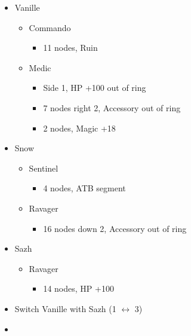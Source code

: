 \begin{paracol}{2}
\begin{menu}
\begin{itemize}
    \crystarium
    \begin{itemize}
        \item Vanille
        \begin{itemize}
            \item Commando
            \begin{itemize}
                \item 11 nodes, Ruin
            \end{itemize}
            \item Medic
            \begin{itemize}
                \item Side 1, HP +100 out of ring
                \item 7 nodes right 2, Accessory out of ring
                \item 2 nodes, Magic +18
            \end{itemize}
        \end{itemize}
        \item Snow
        \begin{itemize}
            \item Sentinel
            \begin{itemize}
                \item 4 nodes, ATB segment
            \end{itemize}
            \item Ravager
            \begin{itemize}
                \item 16 nodes down 2, Accessory out of ring
            \end{itemize}
        \end{itemize}
        \item Sazh
        \begin{itemize}
            \item Ravager
            \begin{itemize}
                \item 14 nodes,  HP +100
            \end{itemize}
        \end{itemize}
    \end{itemize}
    \paradigm
    \begin{itemize}
        \item Switch Vanille with Sazh (1 $\leftrightarrow$ 3)
        \item \paradigmdeck{%
}
\end{itemize}
\end{itemize}
\end{menu}
\end{paracol}

